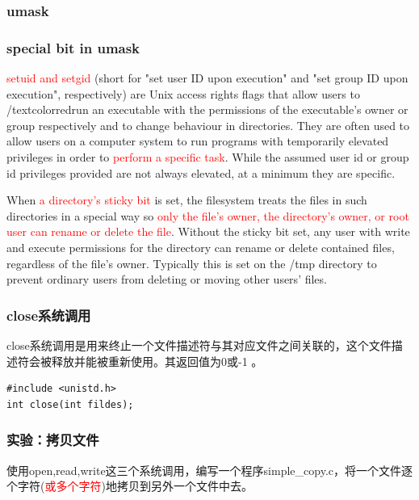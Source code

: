 \documentclass{beamer}
\begin{document}
\begin{frame}
\frametitle{umask}
\end{frame}
\begin{frame}
\frametitle{special bit in umask}
\textcolor{red}{setuid and setgid} (short for "set user ID upon execution" and "set group ID upon execution", respectively) are Unix access rights flags that allow users to /textcolor{red}{run an executable with the permissions of the executable's owner or group respectively} and to change behaviour in directories. They are often used to allow users on a computer system to run programs with temporarily elevated privileges in order to \textcolor{red}{perform a specific task}. While the assumed user id or group id privileges provided are not always elevated, at a minimum they are specific.

When \textcolor{red}{a directory's sticky bit} is set, the filesystem treats the files in such directories in a special way so \textcolor{red}{only the file's owner, the directory's owner, or root user can rename or delete the file}. Without the sticky bit set, any user with write and execute permissions for the directory can rename or delete contained files, regardless of the file's owner. Typically this is set on the /tmp directory to prevent ordinary users from deleting or moving other users' files.
\end{frame}
\begin{frame}[fragile]
\frametitle{close系统调用}
close系统调用是用来终止一个文件描述符与其对应文件之间关联的，这个文件描述符会被释放并能被重新使用。其返回值为0或-1 。
\begin{example}[close系统调用的原型]
\begin{verbatim}
#include <unistd.h>
int close(int fildes);
\end{verbatim}
\end{example}


\end{frame}
\begin{frame}
\frametitle{实验：拷贝文件}
使用open,read,write这三个系统调用，编写一个程序simple\_copy.c，将一个文件逐个字符(\textcolor{red}{或多个字符})地拷贝到另外一个文件中去。
\end{frame}
\end{document}
